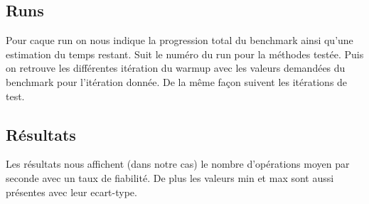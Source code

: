 \documentclass{report}
\begin{document}
			\subsection{Runs}
				Pour caque run on nous indique la progression total du benchmark ainsi qu'une estimation du temps restant.
				Suit le numéro du run pour la méthodes testée.
				Puis on retrouve les différentes itération du warmup avec les valeurs demandées du benchmark pour l'itération donnée.
				De la même façon suivent les itérations de test.
			
			\subsection{Résultats}
				Les résultats nous affichent (dans notre cas) le nombre d'opérations moyen par seconde avec un taux de fiabilité.
				De plus les valeurs min et max sont aussi présentes avec leur ecart-type.
			
\end{document}
